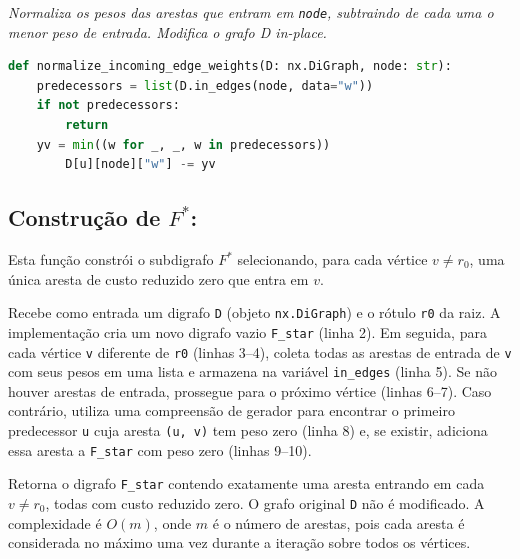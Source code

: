\begin{tcolorbox}[
        enhanced, breakable,
        colframe=blue!60!black, colback=blue!2,
        colbacktitle=blue!15, coltitle=black,
        title={Normalização por vértice: custos reduzidos},
        boxed title style={sharp corners, boxrule=0.6pt},
        sharp corners, boxrule=0.6pt
    ]
    \emph{Normaliza os pesos das arestas que entram em \texttt{node}, subtraindo de cada uma o menor peso de entrada. Modifica o grafo D in-place.}
    \tcblower
    \begin{lstlisting}[language=Python]
def normalize_incoming_edge_weights(D: nx.DiGraph, node: str):    
    predecessors = list(D.in_edges(node, data="w"))
    if not predecessors:
        return
    yv = min((w for _, _, w in predecessors))
        D[u][node]["w"] -= yv   
\end{lstlisting}
\end{tcolorbox}


\subsection{Construção de \texorpdfstring{\(F^*\)}{F*}:}
Esta função constrói o subdigrafo \(F^*\) selecionando, para cada vértice \(v\neq r_0\), uma única aresta de custo reduzido zero que entra em \(v\).

Recebe como entrada um digrafo \texttt{D} (objeto \texttt{nx.DiGraph}) e o rótulo \texttt{r0} da raiz. A implementação cria um novo digrafo vazio \texttt{F\_star} (linha 2). Em seguida, para cada vértice \texttt{v} diferente de \texttt{r0} (linhas 3--4), coleta todas as arestas de entrada de \texttt{v} com seus pesos em uma lista e armazena na variável \texttt{in\_edges} (linha 5). Se não houver arestas de entrada, prossegue para o próximo vértice (linhas 6--7). Caso contrário, utiliza uma compreensão de gerador para encontrar o primeiro predecessor \texttt{u} cuja aresta \texttt{(u, v)} tem peso zero (linha 8) e, se existir, adiciona essa aresta a \texttt{F\_star} com peso zero (linhas 9--10).

Retorna o digrafo \texttt{F\_star} contendo exatamente uma aresta entrando em cada \(v\neq r_0\), todas com custo reduzido zero. O grafo original \texttt{D} não é modificado. A complexidade é \(O(m)\), onde \(m\) é o número de arestas, pois cada aresta é considerada no máximo uma vez durante a iteração sobre todos os vértices.

